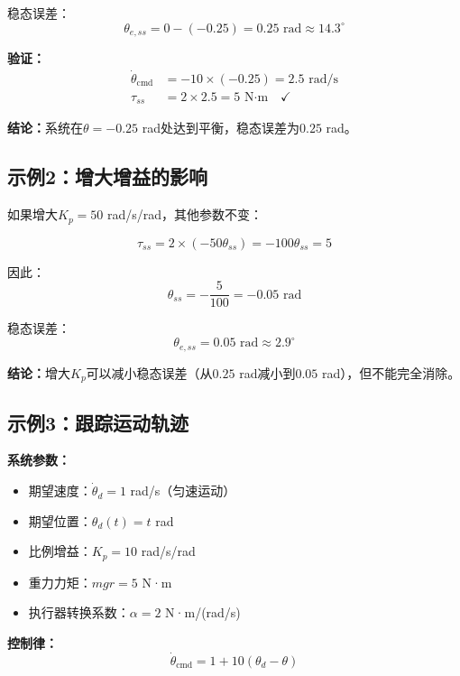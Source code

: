\documentclass[12pt,a4paper]{article}
\begin{document}
稳态误差：
\begin{equation}
\theta_{e,ss} = 0 - (-0.25) = 0.25 \text{ rad} \approx 14.3^\circ
\end{equation}

\textbf{验证：}
\begin{align}
\dot{\theta}_{\text{cmd}} &= -10 \times (-0.25) = 2.5 \text{ rad/s} \\
\tau_{ss} &= 2 \times 2.5 = 5 \text{ N·m} \quad \checkmark
\end{align}

\textbf{结论：}系统在$\theta = -0.25$ rad处达到平衡，稳态误差为$0.25$ rad。

\subsection{示例2：增大增益的影响}

如果增大$K_p = 50$ rad/s/rad，其他参数不变：

\begin{equation}
\tau_{ss} = 2 \times (-50 \theta_{ss}) = -100 \theta_{ss} = 5
\end{equation}

因此：
\begin{equation}
\theta_{ss} = -\frac{5}{100} = -0.05 \text{ rad}
\end{equation}

稳态误差：
\begin{equation}
\theta_{e,ss} = 0.05 \text{ rad} \approx 2.9^\circ
\end{equation}

\textbf{结论：}增大$K_p$可以减小稳态误差（从$0.25$ rad减小到$0.05$ rad），但不能完全消除。

\subsection{示例3：跟踪运动轨迹}

\textbf{系统参数：}
\begin{itemize}
\item 期望速度：$\dot{\theta}_d = 1$ rad/s（匀速运动）
\item 期望位置：$\theta_d(t) = t$ rad
\item 比例增益：$K_p = 10$ rad/s/rad
\item 重力力矩：$mgr = 5$ N·m
\item 执行器转换系数：$\alpha = 2$ N·m/(rad/s)
\end{itemize}

\textbf{控制律：}
\begin{equation}
\dot{\theta}_{\text{cmd}} = 1 + 10(\theta_d - \theta)
\end{equation}
\end{document}
